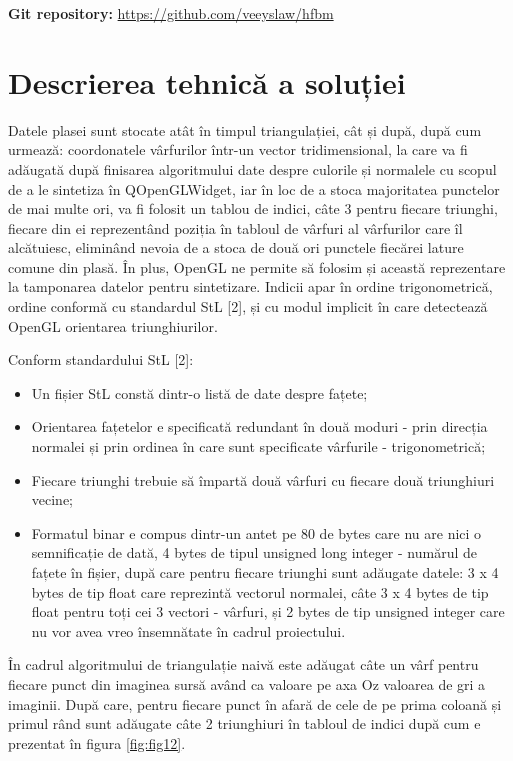 \documentclass[12pt]{article}
\begin{document}
\textbf{Git repository:} \url{https://github.com/veeyslaw/hfbm}

\section{Descrierea tehnică a soluției}

Datele plasei sunt stocate atât în timpul triangulației, cât și după, după cum urmează: coordonatele vârfurilor într-un vector tridimensional, la care va fi adăugată după finisarea algoritmului date despre culorile și normalele cu scopul de a le sintetiza în QOpenGLWidget, iar în loc de a stoca majoritatea punctelor de mai multe ori, va fi folosit un tablou de indici, câte 3 pentru fiecare triunghi, fiecare din ei reprezentând poziția în tabloul de vârfuri al vârfurilor care îl alcătuiesc, eliminând nevoia de a stoca de două ori punctele fiecărei lature comune din plasă. În plus, OpenGL ne permite să folosim și această reprezentare la tamponarea datelor pentru sintetizare. Indicii apar în ordine trigonometrică, ordine conformă cu standardul StL [2], și cu modul implicit în care detectează OpenGL orientarea triunghiurilor.

Conform standardului StL [2]:
\begin{itemize}
	\item Un fișier StL constă dintr-o listă de date despre fațete;
	\item Orientarea fațetelor e specificată redundant în două moduri - prin direcția normalei și prin ordinea în care sunt specificate vârfurile - trigonometrică;
	\item Fiecare triunghi trebuie să împartă două vârfuri cu fiecare două triunghiuri vecine;
	\item Formatul binar e compus dintr-un antet pe 80 de bytes care nu are nici o semnificație de dată, 4 bytes de tipul unsigned long integer - numărul de fațete în fișier, după care pentru fiecare triunghi sunt adăugate datele: 3 x 4 bytes de tip float care reprezintă vectorul normalei, câte 3 x 4 bytes de tip float pentru toți cei 3 vectori - vârfuri, și 2 bytes de tip unsigned integer care nu vor avea vreo însemnătate în cadrul proiectului.
\end{itemize}

În cadrul algoritmului de triangulație naivă este adăugat câte un vârf pentru fiecare punct din imaginea sursă având ca valoare pe axa Oz valoarea de gri a imaginii. După care, pentru fiecare punct în afară de cele de pe prima coloană și primul rând sunt adăugate câte 2 triunghiuri în tabloul de indici după cum e prezentat în figura \ref{fig:fig12}.
\end{document}
